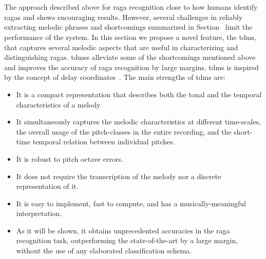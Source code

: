 \section{}
\label{sec:tdms_raga_recognition}


The approach described above for \gls{raga} recognition close to how humans identify \glspl{raga} and shows encouraging results. However, several challenges in reliably extracting melodic phrases and shortcomings summarized in Section~ limit the performance of the system. In this section we propose a novel feature, the \gls{tdms}, that captures several melodic aspects that are useful in characterizing and distinguishing \glspl{raga}. \Glspl{tdms} alleviate some of the shortcomings mentioned above and improves the accuracy of \gls{raga} recognition by large margins. \Gls{tdms} is inspired by the concept of delay coordinates~. The main strengths of \gls{tdms} are:

\begin{itemize}
	\item It is a compact representation that describes both the tonal and the temporal characteristics of a melody
	\item It simultaneously captures the melodic characteristics at different time-scales, the overall usage of the pitch-classes in the entire recording, and the short-time temporal relation between individual pitches.
	\item It is robust to pitch octave errors.
	\item It does not require the transcription of the melody nor a discrete representation of it.
	\item It is easy to implement, fast to compute, and has a musically-meaningful interpretation.
	\item As it will be shown, it obtains unprecedented accuracies in the raga recognition task, outperforming the state-of-the-art by a large margin, without the use of any elaborated classification schema.
\end{itemize}


\subsection{}
\label{sec:tdms_feature_extraction}

